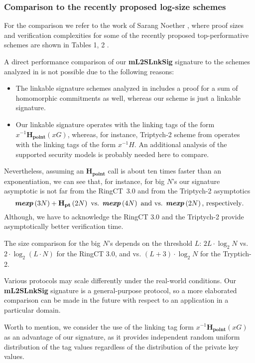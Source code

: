 \documentclass{mathcryptology} %
\newcommand{\Hpoint}{\textbf{H}_{\textbf{point}}}
\newcommand{\Hpt}{\textbf{H}_{\textbf{pt}}}
\newcommand{\mexp}{\textbf{\textit{mexp}}}
\theoremstyle{title}
\theoremstyle{titleof}
\begin{document}
\subsubsection{Comparison to the recently proposed log-size schemes}
    For the comparison we refer to the work of Sarang Noether \cite{14}, where proof sizes and verification complexities for some of the recently proposed top-performative schemes are shown in Tables 1, 2 \cite{14}.

    A direct performance comparison of our \textbf{mL2SLnkSig} signature to the schemes analyzed in \cite{14} is not possible due to the following reasons:
    \begin{itemize}
        \item The linkable signature schemes analyzed in \cite{14} includes a proof for a sum of homomorphic commitments as well, whereas our scheme is just a linkable signature.
        \item Our linkable signature operates with the linking tags of the form $x^{-1}\Hpoint\left(xG\right)$, whereas, for instance, Triptych-2 scheme from \cite{14} operates with the linking tags of the form $x^{-1}H$. An additional analysis of the supported security models is probably needed here to compare.
    \end{itemize}
    Nevertheless, assuming an $\Hpoint$ call is about ten times faster than an exponentiation, we can see that, for instance, for big $N$'s our signature asymptotic is not far from the RingCT~3.0 and from the Triptych-2 asymptotics
    \begin{equation*}
        \mexp \left(3N\right)+ \Hpt\left(2N\right) \text{ vs. } \mexp\left(4N\right) \text{ and vs. } \mexp\left(2N\right)\text{, respectively}.
    \end{equation*}
    Although, we have to acknowledge the RingCT 3.0 and the Triptych-2 provide asymptotically better verification time.

    The size comparison for the big $N$'s depends on the threshold $L$: $2L\cdot \log_{2} N$ vs. $2\cdot \log_{2} \left(L\cdot N\right)$ for the RingCT 3.0, and vs. $\left(L+3\right)\cdot \log_{2} N$ for the Tryptich-2.

    Various protocols may scale differently under the real-world conditions. Our \textbf{mL2SLnkSig} signature is a general-purpose protocol, so a more elaborated comparison can be made in the future with respect to an application in a particular domain.

    Worth to mention, we consider the use of the linking tag form $x^{-1}\Hpoint\left(xG\right)$ as an advantage of our signature, as it provides independent random uniform distribution of the tag values regardless of the distribution of the private key values.
\end{document}
